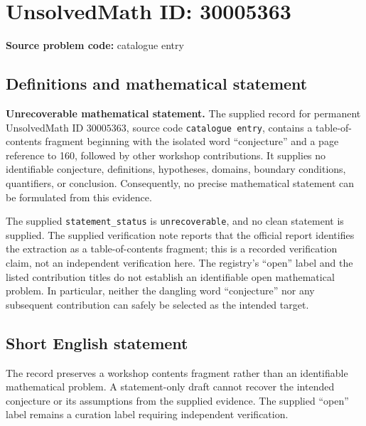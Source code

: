 \documentclass[11pt]{article}
\begin{document}
\section*{UnsolvedMath ID: 30005363}
\textbf{Source problem code:} catalogue entry
\subsection{Definitions and mathematical statement}
\textbf{Unrecoverable mathematical statement.} The supplied record for permanent UnsolvedMath ID \(30005363\), source code \texttt{catalogue entry}, contains a table-of-contents fragment beginning with the isolated word ``conjecture'' and a page reference to 160, followed by other workshop contributions. It supplies no identifiable conjecture, definitions, hypotheses, domains, boundary conditions, quantifiers, or conclusion. Consequently, no precise mathematical statement can be formulated from this evidence.

The supplied \texttt{statement\_status} is \texttt{unrecoverable}, and no clean statement is supplied. The supplied verification note reports that the official report identifies the extraction as a table-of-contents fragment; this is a recorded verification claim, not an independent verification here. The registry's ``open'' label and the listed contribution titles do not establish an identifiable open mathematical problem. In particular, neither the dangling word ``conjecture'' nor any subsequent contribution can safely be selected as the intended target.
\subsection{Short English statement}
The record preserves a workshop contents fragment rather than an identifiable mathematical problem. A statement-only draft cannot recover the intended conjecture or its assumptions from the supplied evidence. The supplied ``open'' label remains a curation label requiring independent verification.
\end{document}
